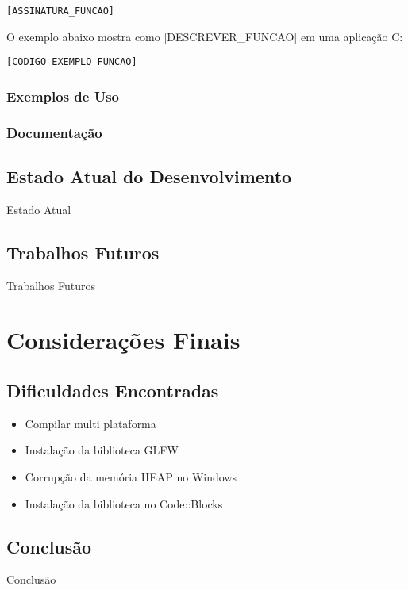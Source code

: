 \documentclass[12pt, %
openright,
oneside, %
a4paper,    %
brazil]{facom-ufu-abntex2}
\begin{document}
\begin{lstlisting}
[ASSINATURA_FUNCAO]
\end{lstlisting}

O exemplo abaixo mostra como [DESCREVER_FUNCAO] em uma aplicação C:

\begin{lstlisting}
[CODIGO_EXEMPLO_FUNCAO]
\end{lstlisting}



\subsection{Exemplos de Uso}

\subsection{Documentação}

\section{Estado Atual do Desenvolvimento}
Estado Atual

\section{Trabalhos Futuros}
Trabalhos Futuros

\chapter{Considerações Finais}

\section{Dificuldades Encontradas}

\begin{itemize}
  
  \item Compilar multi plataforma
  \item Instalação da biblioteca GLFW
  \item Corrupção da memória HEAP no Windows
  \item Instalação da biblioteca no Code::Blocks
  
\end{itemize}

\section{Conclusão}
Conclusão
\end{document}
